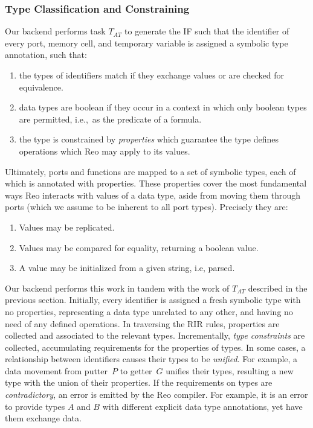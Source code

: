 \subsubsection{Type Classification and Constraining}
Our backend performs task $T_{AT}$ to generate the IF such that the identifier of every port, memory cell, and temporary variable is assigned a symbolic type annotation, such that:
\begin{enumerate}
	\item the types of identifiers match if they exchange values or are checked for equivalence.
	\item data types are boolean if they occur in a context in which only boolean types are permitted, i.e.,\ as the predicate of a formula.
	\item the type is constrained by \textit{properties} which guarantee the type defines operations which Reo may apply to its values. 
\end{enumerate}

Ultimately, ports and functions are mapped to a set of symbolic types, each of which is annotated with properties. These properties cover the most fundamental ways Reo interacts with values of a data type, aside from moving them through ports (which we assume to be inherent to all port types). Precisely they are:
\begin{enumerate}
	\item Values may be replicated.
	\item Values may be compared for equality, returning a boolean value.
	\item A value may be initialized from a given string, i.e, parsed.
\end{enumerate}

Our backend performs this work in tandem with the work of $T_{AT}$ described in the previous section. Initially, every identifier is assigned a fresh symbolic type with no properties, representing a data type unrelated to any other, and having no need of any defined operations. In traversing the RIR rules, properties are collected and associated to the relevant types. Incrementally, \textit{type constraints} are collected, accumulating requirements for the properties of types. In some cases, a relationship between identifiers causes their types to be \textit{unified}. For example, a data movement from putter~$P$ to getter~$G$ unifies their types, resulting a new type with the union of their properties. If the requirements on types are \textit{contradictory}, an error is emitted by the Reo compiler. For example, it is an error to provide types $A$ and $B$ with different explicit data type annotations, yet have them exchange data.

